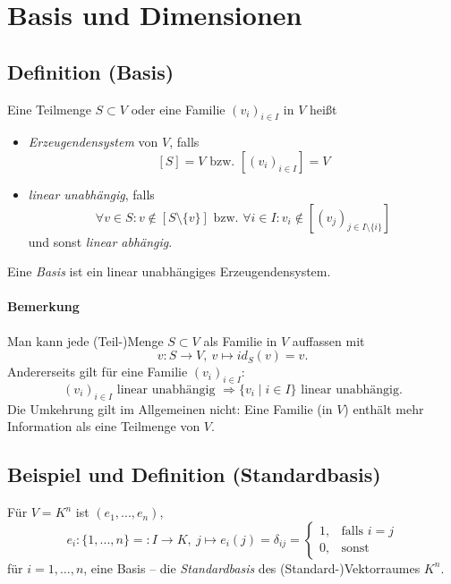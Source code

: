 \section{Basis und Dimensionen}

 \subsection{Definition (Basis)}
 	\begin{Definition}[Basis]
 		Eine Teilmenge $S\subset V$ oder eine Familie $(v_i)_{i\in I}$ in $ V $ heißt
 		\begin{itemize}
 			\item \emph{Erzeugendensystem} von $ V $, falls \[
 			      [S] = V \text{ bzw. } [(v_i)_{i\in I}] = V
 		\]
 		\item \emph{linear unabhängig}, falls \[
 		\forall v\in S: v \notin [S\setminus\{{v\}}] \text{ bzw. } \forall i\in I: v_i \notin [(v_j)_{j\in I\setminus\{{i\}}}]
 	\] und sonst \emph{linear abhängig}.
 	\end{itemize}
 	Eine \emph{Basis} ist ein linear unabhängiges Erzeugendensystem.
 	\end{Definition}

 	\paragraph{Bemerkung}
 		Man kann jede (Teil-)Menge $S\subset V$ als Familie in $V$ auffassen mit
 		\[
 			v: S \to V,\ v\mapsto id_S(v) = v.
 		\]
 		Andererseits gilt für eine Familie $(v_i)_{i\in I} $:
 		\[
 			(v_i)_{i\in I} \text{ linear unabhängig } \Rightarrow \{v_i \mid i\in I\} \text{ linear unabhängig.}
 		\]
 		Die Umkehrung gilt im Allgemeinen nicht: Eine Familie (in $ V $) enthält mehr Information als eine Teilmenge von $ V $.

 \subsection{Beispiel und Definition (Standardbasis)}
 	\begin{Definition}[Standardbasis]
 		Für $V = K^n$ ist $(e_1, ... , e_n)$,
 		\begin{equation*}
 			e_i:\{{1, ... ,n\}} =: I\to K,\ j\mapsto e_i(j)= \delta_{ij}=
 			\begin{cases}
 				1, & \text{falls } i=j \\
 				0, & \text{sonst}
 			\end{cases}
 		\end{equation*}
 		für $i=1,\dots,n$, eine Basis -- die \emph{Standardbasis} des (Standard-)Vektorraumes $K^n$.
 	\end{Definition}

